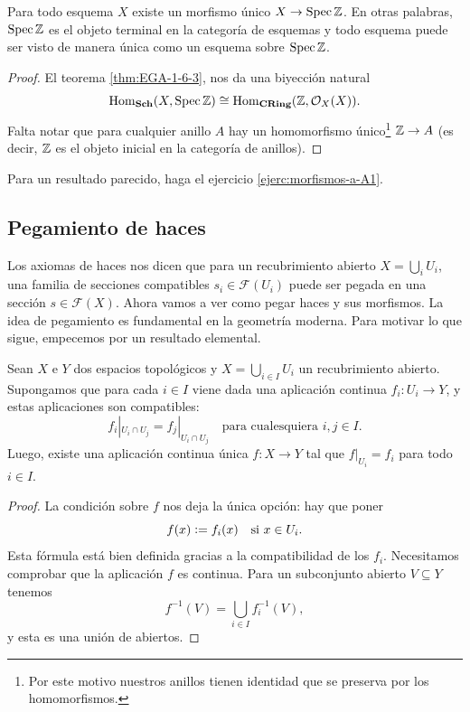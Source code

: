 \documentclass{article}
\numberwithin{equation}{section}
\theoremstyle{definition}
\begin{document}
\begin{proposicion}
  \label{prop:morfismos-a-Spec-Z}
  Para todo esquema $X$ existe un morfismo único $X \to \operatorname{Spec} \mathbb{Z}$. En otras
  palabras, $\operatorname{Spec} \mathbb{Z}$ es el objeto terminal en la categoría de esquemas y todo
  esquema puede ser visto de manera única como un esquema sobre $\operatorname{Spec} \mathbb{Z}$.

  \begin{proof}
    El teorema \ref{thm:EGA-1-6-3}, nos da una biyección natural
    $$\operatorname{Hom}_{\text{\bf Sch}} (X, \operatorname{Spec} \mathbb{Z}) \cong \operatorname{Hom}_{\text{\bf CRing}} (\mathbb{Z}, \mathcal{O}_X (X)).$$
    Falta notar que para cualquier anillo $A$ hay un homomorfismo
    único\footnote{Por este motivo nuestros anillos tienen identidad que se
      preserva por los homomorfismos.} $\mathbb{Z} \to A$ (es decir, $\mathbb{Z}$ es el objeto
    inicial en la categoría de anillos).
  \end{proof}
\end{proposicion}

Para un resultado parecido, haga el ejercicio \ref{ejerc:morfismos-a-A1}.

\subsection{Pegamiento de haces}


Los axiomas de haces nos dicen que para un recubrimiento abierto
$X = \bigcup_i U_i$, una familia de secciones compatibles
$s_i \in \mathcal{F} (U_i)$ puede ser pegada en una sección
$s \in \mathcal{F} (X)$. Ahora vamos a ver como pegar haces y sus morfismos.
La idea de pegamiento es fundamental en la geometría moderna. Para motivar
lo que sigue, empecemos por un resultado elemental.

\begin{proposicion}
  \label{prop:pegamiento-de-aplicaciones-continuas}
  Sean $X$ e $Y$ dos espacios topológicos y $X = \bigcup_{i\in I} U_i$
  un recubrimiento abierto. Supongamos que para cada $i\in I$ viene dada
  una aplicación continua $f_i\colon U_i \to Y$, y estas aplicaciones
  son compatibles:
  \[ f_i|_{U_i \cap U_j} = f_j|_{U_i\cap U_j}
     \quad\text{para cualesquiera }i,j \in I. \]
  Luego, existe una aplicación continua única $f\colon X\to Y$ tal que
  $f|_{U_i} = f_i$ para todo $i \in I$.

  \begin{proof}
    La condición sobre $f$ nos deja la única opción: hay que poner
    $$f (x) \mathrel{\mathop:}= f_i (x)\quad\text{si }x \in U_i.$$
    Esta fórmula está bien definida gracias a la compatibilidad de
    los $f_i$. Necesitamos comprobar que la aplicación $f$ es continua.
    Para un subconjunto abierto $V \subseteq Y$ tenemos
    $$f^{-1} (V) = \bigcup_{i\in I} f_i^{-1} (V),$$
    y esta es una unión de abiertos.
  \end{proof}
\end{proposicion}
\end{document}
